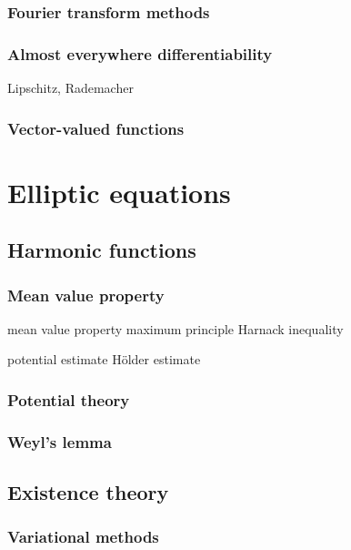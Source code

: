 \documentclass{../note}
\begin{document}
\section{Fourier transform methods}
\section{Almost everywhere differentiability}
Lipschitz, Rademacher
\section{Vector-valued functions}








\part{Elliptic equations}


\chapter{Harmonic functions}
\section{Mean value property}
mean value property
maximum principle
Harnack inequality

potential estimate
H\"older estimate

\section{Potential theory}

\section{Weyl's lemma}



\chapter{Existence theory}

\section{Variational methods}
\end{document}
